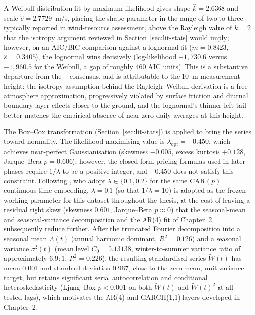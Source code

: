 ﻿\documentclass[11pt, a4paper, twoside]{article}
\begin{document}
A Weibull distribution fit by maximum likelihood gives shape $\hat k = 2.6368$ and scale $\hat c = 2.7729$~m/s, placing the shape parameter in the range of two to three typically reported in wind-resource assessment, above the Rayleigh value of $k = 2$ that the \citet{TullerBrett1984} isotropy argument reviewed in Section~\ref{sec:lit-stats} would imply; however, on an AIC/BIC comparison against a lognormal fit ($\hat m = 0.8423$, $\hat s = 0.3405$), the lognormal wins decisively (log-likelihood $-1{,}730.6$ versus $-1{,}960.5$ for the Weibull, a gap of roughly 460 AIC units). This is a substantive departure from the \citet{TullerBrett1984}--\citet{Garcia1998} consensus, and is attributable to the 10~m measurement height: the isotropy assumption behind the Rayleigh--Weibull derivation is a free-atmosphere approximation, progressively violated by surface friction and diurnal boundary-layer effects closer to the ground, and the lognormal's thinner left tail better matches the empirical absence of near-zero daily averages at this height.

The Box--Cox transformation (Section~\ref{sec:lit-stats}) is applied to bring the series toward normality. The likelihood-maximising value is $\lambda_{\text{opt}} = -0.450$, which achieves near-perfect Gaussianisation (skewness $-0.005$, excess kurtosis $+0.128$, Jarque--Bera $p = 0.606$); however, the closed-form pricing formulas used in later phases require $1/\lambda$ to be a positive integer, and $-0.450$ does not satisfy this constraint. Following \citet{BenthSaltyteBenth2009}, who adopt $\lambda \in \{0.1, 0.2\}$ for the same CAR$(p)$ continuous-time embedding, $\lambda = 0.1$ (so that $1/\lambda = 10$) is adopted as the frozen working parameter for this dataset throughout the thesis, at the cost of leaving a residual right skew (skewness $0.601$, Jarque--Bera $p \approx 0$) that the seasonal-mean and seasonal-variance decomposition and the AR(4) fit of Chapter~2 subsequently reduce further. After the truncated Fourier decomposition into a seasonal mean $\Lambda(t)$ (annual harmonic dominant, $R^2 = 0.126$) and a seasonal variance $\sigma^2(t)$ (mean level $C_0 = 0.13138$, winter-to-summer variance ratio of approximately $6.9{:}1$, $R^2 = 0.226$), the resulting standardised series $\widetilde W(t)$ has mean $0.001$ and standard deviation $0.967$, close to the zero-mean, unit-variance target, but retains significant serial autocorrelation and conditional heteroskedasticity (Ljung--Box $p < 0.001$ on both $\widetilde W(t)$ and $\widetilde W(t)^2$ at all tested lags), which motivates the AR(4) and GARCH(1,1) layers developed in Chapter~2.
\end{document}
